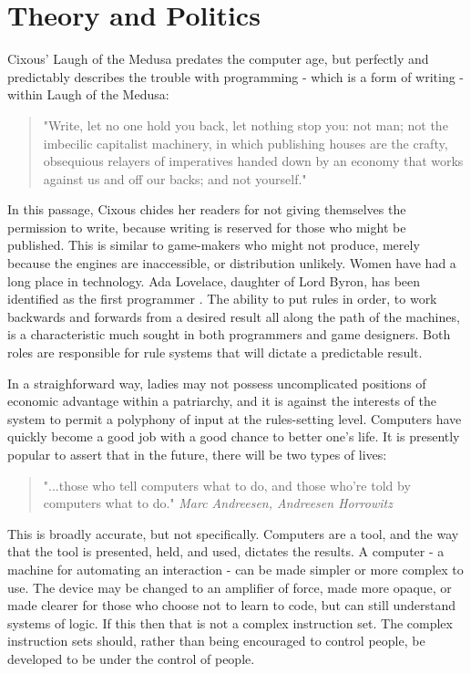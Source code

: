 \section{Theory and Politics}
Cixous' Laugh of the Medusa predates the computer age, but perfectly and predictably describes the trouble with programming - which is a form of writing - within Laugh of the Medusa:
\begin{quote}
"Write, let no one hold you back, let nothing stop you: not man; not the imbecilic capitalist machinery, in which publishing houses are the crafty, obsequious relayers of imperatives handed down by an economy that works against us and off our backs; and not yourself." 
\textit{\parencite{cixous}}
\end{quote}

In this passage, Cixous chides her readers for not giving themselves the permission to write, because writing is reserved for those who might be published. This is similar to game-makers who might not produce, merely because the engines are inaccessible, or distribution unlikely. Women have had a long place in technology.
Ada Lovelace, daughter of Lord Byron, has been identified as the first programmer \parencite{plant}. The ability to put rules in order, to work backwards and forwards from a desired result all along the path of the machines, is a characteristic much sought in both programmers and game designers. Both roles are responsible for rule systems that will dictate a predictable result.

In a straighforward way, ladies may not possess uncomplicated positions of economic advantage within a patriarchy, and it is against the interests of the system to permit a polyphony of input at the rules-setting level. Computers have quickly become a good job with a good chance to better one's life. It is presently popular to assert that in the future, there will be two types of lives:

\begin{quote}
"...those who tell computers what to do, and those who're told by computers what to do."
\textit{Marc Andreesen, Andreesen Horrowitz}
\end{quote}

This is broadly accurate, but not specifically. Computers are a tool, and the way that the tool is presented, held, and used, dictates the results. A computer - a machine for automating an interaction - can be made simpler or more complex to use. The device may be changed to an amplifier of force, made more opaque, or made clearer for those who choose not to learn to code, but can still understand systems of logic. If this then that is not a complex instruction set. The complex instruction sets should, rather than being encouraged to control people, be developed to be under the control of people.

